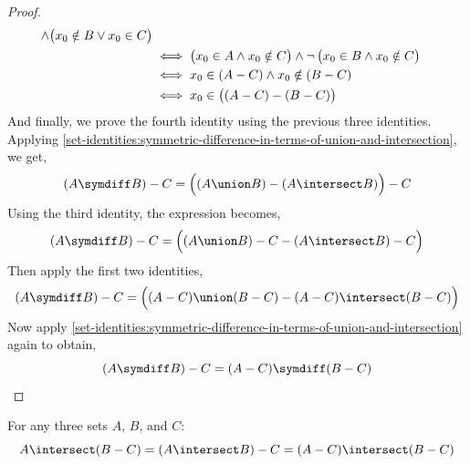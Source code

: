 \begin{proof}
\begin{align*}
        \land
        \big( x_{0} \notin B \lor x_{0} \in C \big)\\
        &\iff
        \big( x_{0} \in A \land x_{0} \notin C \big)
        \land
        \lnot \, \big( x_{0} \in B \land x_{0} \notin C \big)\\
        &\iff
        x_{0} \in \mleft( A - C \mright) \land x_{0} \notin \mleft( B - C \mright)\\
        &\iff
        x_{0} \in \big( \mleft( A - C \mright) - \mleft( B - C \mright) \big)
    \end{align*}
    And finally, we prove the fourth identity using the previous three identities.
    Applying \cref{set-identities:symmetric-difference-in-terms-of-union-and-intersection},
    we get,
    \begin{equation*}
        \mleft( A \symdiff B \mright) - C = \Big( \mleft( A \union B \mright) - \mleft( A \intersect B \mright) \Big) - C
    \end{equation*}
    Using the third identity, the expression becomes,
    \begin{equation*}
        \mleft( A \symdiff B \mright) - C
        =
        \Big( \mleft( A \union B \mright) - C - \mleft( A \intersect B \mright) - C \Big)
    \end{equation*}
    Then apply the first two identities,
    \begin{equation*}
        \mleft( A \symdiff B \mright) - C
        =
        \Big( \mleft( A - C \mright) \union \mleft( B - C \mright) - \mleft( A - C \mright) \intersect \mleft( B - C \mright) \Big)
    \end{equation*}
    Now apply \cref{set-identities:symmetric-difference-in-terms-of-union-and-intersection} again to obtain,
    \begin{equation*}
        \mleft( A \symdiff B \mright) - C = \mleft( A - C \mright) \symdiff \mleft( B - C\mright) \qedhere
    \end{equation*}
\end{proof}

\begin{thm}
    \label{set-identities:associativity-of-intersection-difference}
    For any three sets \( A \), \( B \), and \( C \):
    \begin{equation*}
        A \intersect \mleft( B - C \mright)
        = \mleft( A \intersect B \mright) - C
        = \mleft( A - C \mright) \intersect \mleft( B - C \mright)
    \end{equation*}
\end{thm}

